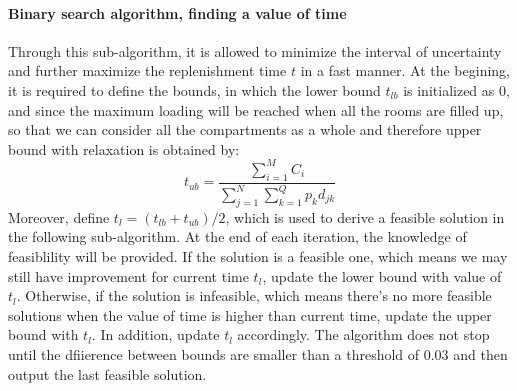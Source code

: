 \documentclass{article}
\begin{document}
\paragraph{Binary search algorithm, finding a value of time} Through this sub-algorithm, it is allowed to minimize the interval of uncertainty and further maximize the replenishment time $t$ in a fast manner. At the begining, it is required to define the bounds, in which the lower bound $t_{lb}$ is initialized as 0, and since the maximum loading will be reached when all the rooms are filled up, so that we can consider all the compartments as a whole and therefore upper bound with relaxation is obtained by:
\begin{equation}
t_{ub} = \frac{\sum _{i=1}^{M}C_i}{\sum _{j=1}^{N}\sum _{k=1}^{Q}p_kd_{jk}}
\end{equation}
Moreover, define $t_l=(t_{lb}+t_{ub})/2$, which is used to derive a feasible solution in the following sub-algorithm. At the end of each iteration, the knowledge of feasiblility will be provided. If the solution is a feasible one, which means we may still have improvement for current time $t_l$, update the lower bound with value of $t_l$. Otherwise, if the solution is infeasible, which means there's no more feasible solutions when the value of time is higher than current time, update the upper bound with $t_l$. In addition, update $t_l$ accordingly. The algorithm does not stop until the dfiierence between bounds are smaller than a threshold of 0.03 and then output the last feasible solution.
\end{document}
